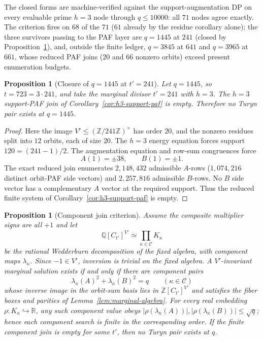 \documentclass[11pt]{article}
\theoremstyle{plain}
\newtheorem{proposition}[theorem]{Proposition}
\theoremstyle{definition}
\theoremstyle{remark}
\newcommand{\Z}{\mathbb Z}
\newcommand{\Q}{\mathbb Q}
\begin{document}
The closed forms are machine-verified against the support-augmentation DP
on every evaluable prime $h=3$ node through $q\le10000$: all $71$ nodes
agree exactly.  The criterion fires on $68$ of the $71$ ($61$ already by
the residue corollary alone); the three survivors passing to the PAF
layer are $q=1445$ at $241$ (closed by
Proposition~\ref{prop:q1445-h3-paf}), and, outside the finite ledger,
$q=3845$ at $641$ and $q=3965$ at $661$, whose reduced PAF joins ($20$
and $66$ nonzero orbits) exceed present enumeration budgets.

\begin{proposition}[Closure of $q=1445$ at $t'=241$]\label{prop:q1445-h3-paf}
Let $q=1445$, so $t=723=3\cdot241$, and take the marginal divisor
$t'=241$ with $h=3$.  The $h=3$ support-PAF join of
Corollary~\ref{cor:h3-support-paf} is empty.  Therefore no Turyn pair exists
at $q=1445$.
\end{proposition}

\begin{proof}
Here the image $V'\le(\Z/241\Z)^\times$ has order $20$, and the nonzero
residues split into $12$ orbits, each of size $20$.  The $h=3$ energy equation
forces support $120=(241-1)/2$.  The augmentation equation and row-sum
congruences force
\[
  A(1)=\pm38,\qquad B(1)=\pm1 .
\]
The exact reduced join enumerates $2{,}148{,}432$ admissible $A$-rows
($1{,}074{,}216$ distinct orbit-PAF side vectors) and $2{,}257{,}816$
admissible $B$-rows.  No $B$ side vector has a complementary $A$ vector at the
required support.  Thus the reduced finite system of
Corollary~\ref{cor:h3-support-paf} is empty.
\end{proof}

\begin{proposition}[Component join criterion]\label{prop:component-join}
Assume the composite multiplier signs are all $+1$ and let
\[
  \Q[C_{t'}]^{V'}\simeq\prod_{\kappa\in\mathcal C}K_\kappa
\]
be the rational Wedderburn decomposition of the fixed algebra, with component
maps $\lambda_\kappa$.  Since $-1\in V'$, inversion is trivial on the fixed
algebra.  A $V'$-invariant marginal solution exists if and only if there are
component pairs
\[
  \lambda_\kappa(A)^2+\lambda_\kappa(B)^2=q\qquad(\kappa\in\mathcal C)
\]
whose inverse image in the orbit-sum basis lies in
$\Z[C_{t'}]^{V'}$ and satisfies the fiber boxes and parities of
Lemma~\ref{lem:marginal-algebra}.  For every real embedding
$\rho:K_\kappa\hookrightarrow\mathbb R$, any such component value obeys
$|\rho(\lambda_\kappa(A))|,|\rho(\lambda_\kappa(B))|\le\sqrt q$; hence each
component search is finite in the corresponding order.  If the finite component
join is empty for some $t'$, then no Turyn pair exists at $q$.
\end{proposition}
\end{document}
